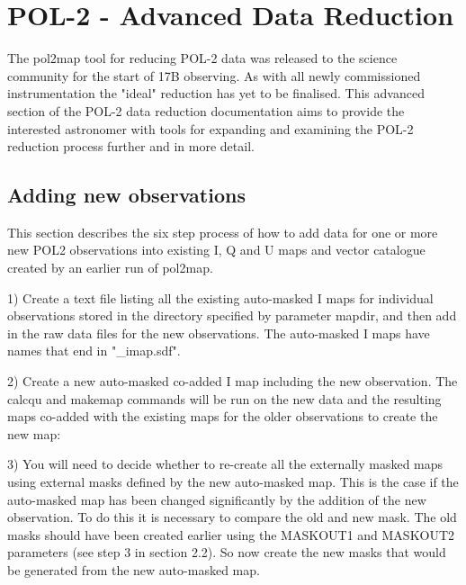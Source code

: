 \chapter{POL-2 - Advanced Data Reduction}
\label{sec:advanced}


The pol2map tool for reducing POL-2 data was released to the science
community for the start of 17B observing. As with all newly commissioned
instrumentation the "ideal" reduction has yet to be finalised. This advanced 
section of the POL-2 data reduction documentation aims to provide the interested
astronomer with tools for expanding and examining the POL-2 reduction process further and 
in more detail.


\section{Adding new observations}

This section describes the six step process of how to add 
data for one or more new POL2 observations into existing I,
Q and U maps and vector catalogue created by an earlier run of pol2map.

1) Create a text file listing all the existing auto-masked I maps for individual observations
stored in the directory specified by parameter mapdir, and then add in the raw data files
for the new observations. The auto-masked I maps have names that end in "_imap.sdf".

\begin{terminalv}
\end{terminalv}


2) Create a new auto-masked co-added I map including the new observation. The
calcqu  and makemap
commands will be run on the new data and the resulting maps co-added
with the existing maps for the older observations to create the new map:

\begin{terminalv}
\end{terminalv}


3) You will need to decide whether to re-create all the externally masked maps using
external masks defined by the new auto-masked map. This is the case if the auto-masked
map has been changed significantly by the addition of the new observation. To do this it is
necessary to compare the old and new mask.  The old masks should have been created
earlier using the MASKOUT1 and MASKOUT2 parameters (see step 3 in section 2.2). So
now create the new masks that would be generated from the new auto-masked map.

